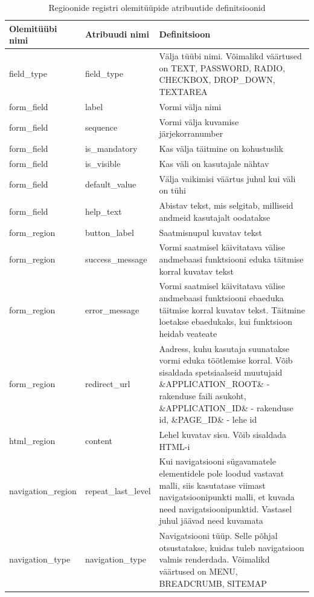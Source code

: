 \documentclass[a4paper,12pt]{article} %
\begin{document}
\begin{table}[H]
\centering
\caption{Regioonide registri olemitüüpide atribuutide definitsioonid}
\label{table_er_regioonide_registri_olemitüüpide_atribuutide_definitsioonid}
\begin{tabular}{|p{4cm}|p{4cm}|p{7cm}|}
\hline
\rowcolor{rowgray}
Olemitüübi nimi & Atribuudi nimi & Definitsioon \\ \hline
field\_type & field\_type & Välja tüübi nimi. Võimalikd väärtused on TEXT, PASSWORD, RADIO, CHECKBOX, DROP\_DOWN, TEXTAREA \\ \hline
form\_field & label & Vormi välja nimi \\ \hline
form\_field & sequence & Vormi välja kuvamise järjekorranumber \\ \hline
form\_field & is\_mandatory & Kas välja täitmine on kohustuslik \\ \hline
form\_field & is\_visible & Kas väli on kasutajale nähtav \\ \hline
form\_field & default\_value & Välja vaikimisi väärtus juhul kui väli on tühi \\ \hline
form\_field & help\_text & Abistav tekst, mis selgitab, milliseid andmeid kasutajalt oodatakse \\ \hline
form\_region & button\_label & Saatmisnupul kuvatav tekst \\ \hline
form\_region & success\_message & Vormi saatmisel käivitatava välise andmebaasi funktsiooni eduka täitmise korral kuvatav tekst \\ \hline
form\_region & error\_message & Vormi saatmisel käivitatava välise andmebaasi funktsiooni ebaeduka täitmise korral kuvatav tekst. Täitmine loetakse ebaedukaks, kui funktsioon heidab veateate  \\ \hline
form\_region & redirect\_url & Aadress, kuhu kasutaja suunatakse vormi eduka töötlemise korral. Võib sisaldada spetsiaalseid muutujaid \&APPLICATION\_ROOT\& - rakenduse faili asukoht, \&APPLICATION\_ID\& - rakenduse id, \&PAGE\_ID\& - lehe id \\ \hline
html\_region & content & Lehel kuvatav sisu. Võib sisaldada HTML-i \\ \hline
navigation\_region & repeat\_last\_level & Kui navigatsiooni sügavamatele elementidele pole loodud vastavat malli, siis kasutatase viimast navigatsioonipunkti malli, et kuvada need navigatsioonipunktid. Vastasel juhul jäävad need kuvamata  \\ \hline
navigation\_type & navigation\_type & Navigatsiooni tüüp. Selle põhjal otsustatakse, kuidas tuleb navigatsioon valmis renderdada. Võimalikd väärtused on MENU, BREADCRUMB, SITEMAP \\ \hline

\end{tabular}
\end{table}
\end{document}
